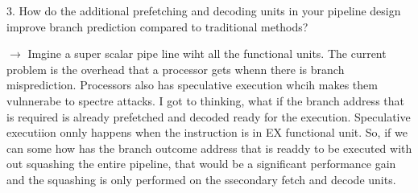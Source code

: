 3. How do the additional prefetching and decoding units in your pipeline design improve branch prediction compared to traditional methods?

$\longrightarrow$ Imgine a super scalar pipe line wiht all the functional units. The current problem is the overhead that a processor gets whenn there is branch misprediction. Processors also has speculative execution whcih makes them vulnnerabe to spectre attacks. 
I got to thinking, what if the branch address that is required is already prefetched and decoded ready for the execution. Speculative executiion onnly happens when the instruction is in EX functional unit. So, if we can some how has the branch outcome address that is readdy to be executed with out squashing the entire pipeline, that would be a significant performance gain and the squashing is only performed on the ssecondary fetch and decode units.

